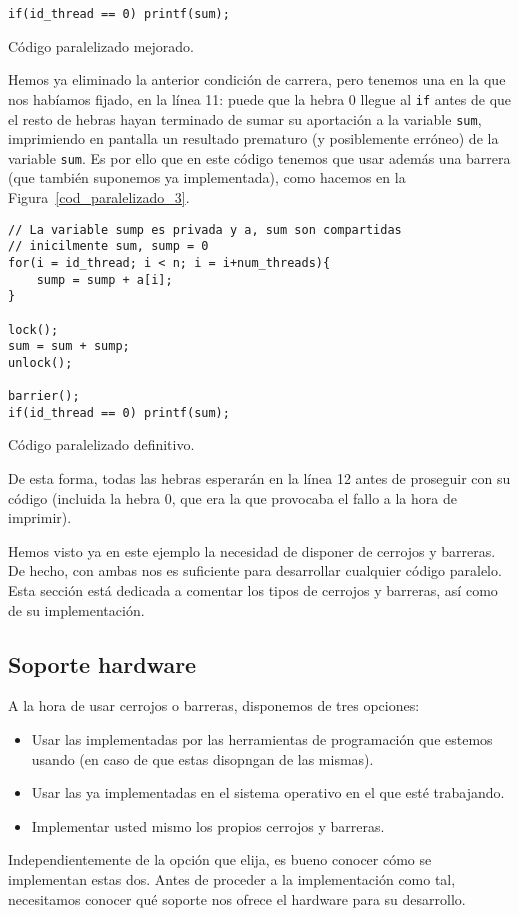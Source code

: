 \begin{ejemplo}
\begin{listing}[H]
\begin{verbatim}
if(id_thread == 0) printf(sum);
\end{verbatim}
\caption{Código paralelizado mejorado.}
\label{cod_paralelizado_2}
\end{listing}
Hemos ya eliminado la anterior condición de carrera, pero tenemos una en la que nos habíamos fijado, en la línea 11: puede que la hebra 0 llegue al \verb|if| antes de que el resto de hebras hayan terminado de sumar su aportación a la variable \verb|sum|, imprimiendo en pantalla un resultado prematuro (y posiblemente erróneo) de la variable \verb|sum|. Es por ello que en este código tenemos que usar además una barrera (que también suponemos ya implementada), como hacemos en la Figura~\ref{cod_paralelizado_3}.
\begin{listing}[H]
\centering
\begin{verbatim}
// La variable sump es privada y a, sum son compartidas
// inicilmente sum, sump = 0
for(i = id_thread; i < n; i = i+num_threads){
    sump = sump + a[i];
}

lock();
sum = sum + sump;
unlock();

barrier();
if(id_thread == 0) printf(sum);
\end{verbatim}
\caption{Código paralelizado definitivo.}
\label{cod_paralelizado_3}
\end{listing}

De esta forma, todas las hebras esperarán en la línea 12 antes de proseguir con su código (incluida la hebra 0, que era la que provocaba el fallo a la hora de imprimir).
\end{ejemplo}
Hemos visto ya en este ejemplo la necesidad de disponer de cerrojos y barreras. De hecho, con ambas nos es suficiente para desarrollar cualquier código paralelo. Esta sección está dedicada a comentar los tipos de cerrojos y barreras, así como de su implementación.

\subsection{Soporte hardware}
A la hora de usar cerrojos o barreras, disponemos de tres opciones:
\begin{itemize}
    \item Usar las implementadas por las herramientas de programación que estemos usando (en caso de que estas disopngan de las mismas).
    \item Usar las ya implementadas en el sistema operativo en el que esté trabajando.
    \item Implementar usted mismo los propios cerrojos y barreras.
\end{itemize}
Independientemente de la opción que elija, es bueno conocer cómo se implementan estas dos. Antes de proceder a la implementación como tal, necesitamos conocer qué soporte nos ofrece el hardware para su desarrollo.\\

